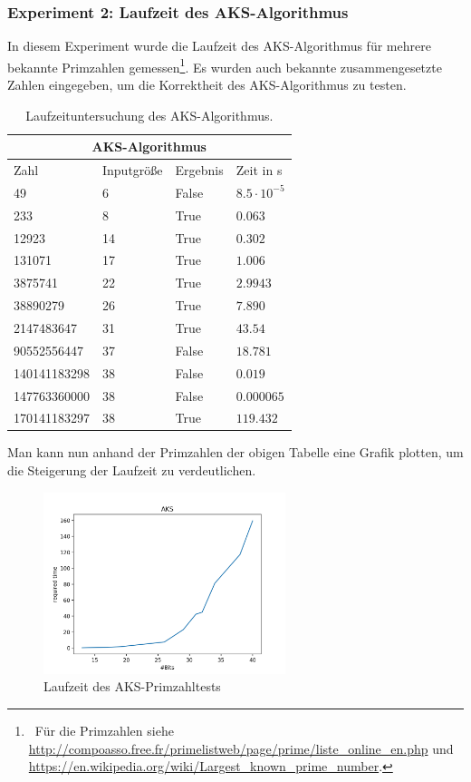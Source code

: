 \documentclass[12pt,oneside]{article}
\theoremstyle{remark}
\theoremstyle{definition}
\begin{document}
\subsubsection{Experiment 2: Laufzeit des AKS-Algorithmus}
In diesem Experiment wurde die Laufzeit des AKS-Algorithmus für mehrere bekannte Primzahlen gemessen\footnote{$\,$ Für die Primzahlen siehe \url{http://compoasso.free.fr/primelistweb/page/prime/liste_online_en.php} und \url{https://en.wikipedia.org/wiki/Largest_known_prime_number}.}. Es wurden auch bekannte zusammengesetzte Zahlen eingegeben, um die Korrektheit des AKS-Algorithmus zu testen.
\begin{table}[h!]
\centering
\begin{tabular}{ |p{3cm}||p{3cm}|p{3cm}|p{3cm}|  }
 \hline
 \multicolumn{4}{|c|}{AKS-Algorithmus} \\
 \hline
 Zahl & Inputgröße &Ergebnis&Zeit in s\\
 \hline
 49   & 6    &False&   $8.5 \cdot 10^{-5}$\\
 233&   8  & True   &$0.063$\\
 12923 &14 & True&  $0.302$\\
 131071    &17 & True&  $1.006$\\
 3875741& 22  & True   &$2.9943$\\
 38890279& 26  & True& $7.890$\\
 2147483647&   31  & True& $43.54$\\
 90552556447&   37  & False& $18.781$\\
 140141183298&   38  & False& $0.019$\\
 147763360000&   38  & False& $0.000065$\\
 170141183297& 38 & True& $119.432$\\
 \hline
\end{tabular}

 \caption{Laufzeituntersuchung des AKS-Algorithmus.}
\label{table:3}
\end{table}

Man kann nun anhand der Primzahlen der obigen Tabelle eine Grafik plotten, um die Steigerung der Laufzeit zu verdeutlichen. 

\begin{figure}[h]
\includegraphics[width=7.06cm]{plots/aks.png}
\centering
\caption{Laufzeit des AKS-Primzahltests}
\label{aks-runtime}
\end{figure}
\end{document}
